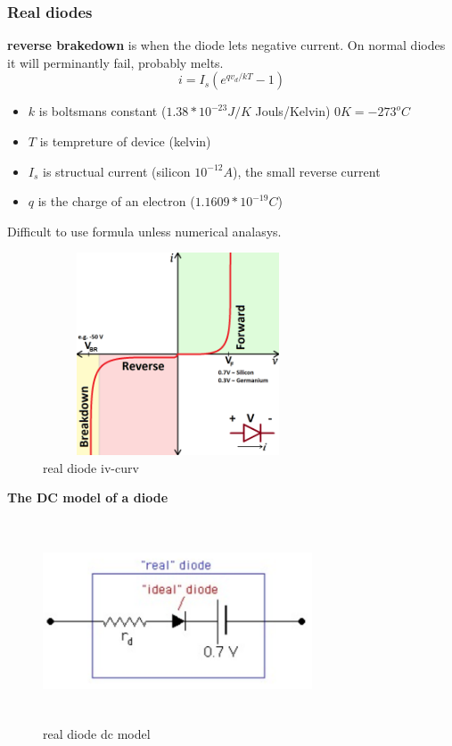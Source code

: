\documentclass{article}
\begin{document}
\subsubsection{Real diodes}
\textbf{reverse brakedown} is when the diode lets negative current. 
On normal diodes it will perminantly fail, probably melts.
\begin{equation}
  i=I_s(e^{qv_d/kT}-1)
\end{equation}
\begin{itemize}
  \item  $k$ is boltsmans constant ($1.38*10^{-23}J/K$ Jouls/Kelvin) $0K=-273^oC$
  \item  $T$ is tempreture of device (kelvin)
  \item  $I_s$ is structual current (silicon $10^{-12}A$), the small reverse current
  \item  $q$ is the charge of an electron ($1.1609*10^{-19}C$)
\end{itemize}

Difficult to use formula unless numerical analasys.

\begin{figure}[h]
    \centering
    \includegraphics[width=8cm, height=6cm]{image/real-diode.png}
    \caption{real diode iv-curv}
\end{figure}

\newpage
\textbf{The DC model of a diode}
\begin{figure}[h]
    \centering
    \includegraphics[width=8cm, height=6cm]{image/real_diode_dc.png}
    \caption{real diode dc model}
\end{figure}
\end{document}
